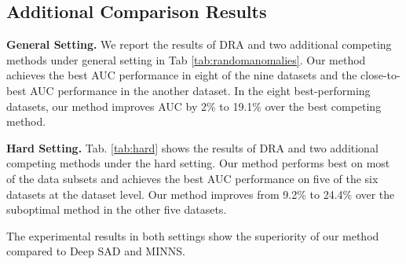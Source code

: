 \documentclass[10pt,twocolumn,letterpaper]{article}
\begin{document}
\subsection{Additional Comparison Results}
\noindent\textbf{General Setting.} We report the results of DRA and two additional competing methods under general setting in Tab \ref{tab:randomanomalies}. Our method achieves the best AUC performance in eight of the nine datasets and the close-to-best AUC performance in the another dataset. In the eight best-performing datasets, our method improves AUC by 2\% to 19.1\% over the best competing method.

\noindent\textbf{Hard Setting.} Tab. \ref{tab:hard} shows the results of DRA and two additional competing methods under the hard setting. Our method performs best on most of the data subsets and achieves the best AUC performance on five of the six datasets at the dataset level. 
Our method improves from 9.2\% to 24.4\% over the suboptimal method in the other five datasets.

The experimental results in both settings show the superiority of our method compared to Deep SAD and MINNS.
\end{document}
